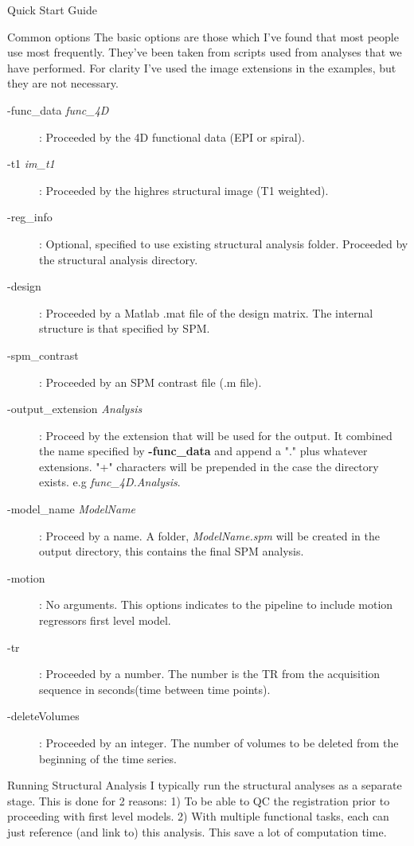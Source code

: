 \documentclass[]{report}
\begin{document}
\begin{chapter}{Quick Start Guide }

\begin{section}{Common options}
The basic options are those which I've found that most people use most frequently. They've been taken from scripts used from analyses that we have performed. For clarity I've used the image extensions in the examples, but they are not necessary.
\begin{description}
	\item [-func\_data {\it func\_4D}] :  Proceeded by the 4D functional data (EPI or spiral).
	\item [ -t1 {\it im\_t1}]  : Proceeded by the highres structural image (T1 weighted). 
	\item [-reg\_info] : Optional, specified to use existing structural analysis folder. Proceeded by the structural analysis directory.
	\item [-design] : Proceeded by a Matlab .mat file of the design matrix. The internal structure is that specified by SPM.
	\item [-spm\_contrast] : Proceeded by an SPM contrast file (.m file).
	\item [-output\_extension {\it Analysis}] : Proceed by the extension that will be used for the output. It combined the name  
						\hspace*{1cm} specified by {\bf -func\_data} and append a "." plus whatever extensions. "+"  characters will be prepended in the case 
						\hspace*{1cm} the directory exists. e.g {\it func\_4D.Analysis}.
	\item[-model\_name {\it ModelName}] : Proceed by a name. A folder, {\it ModelName.spm} will be created in the output directory, this contains the final SPM analysis.
	\item[-motion] : No arguments. This options indicates to the pipeline to include motion regressors first level model.
	\item[-tr] : Proceeded by a number. The number is the TR from the acquisition sequence in seconds(time between time points).
	\item[-deleteVolumes] : Proceeded by an integer. The number of volumes to be deleted from the beginning of the time series.
\end{description}
\end{section}
\begin{section}{Running Structural Analysis}
I typically run the structural analyses as a separate stage. This is done for 2 reasons: 1) To be able to QC the registration prior to proceeding with first level models. 2) With multiple functional tasks, each can just reference (and link to) this analysis. This save a lot of computation time. 


\end{section}
\end{chapter}
\end{document}

